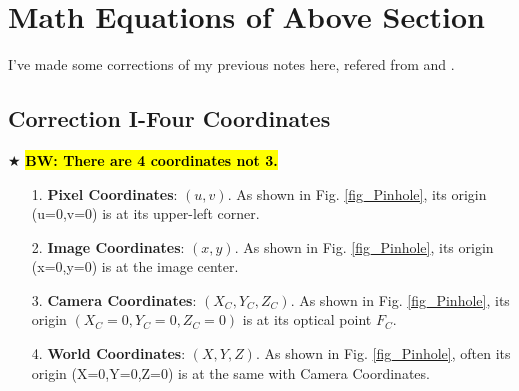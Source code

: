 \documentclass{article}
\begin{document}
\section{Math Equations of Above Section}
\label{sec:Math_Equ_conclusion}
I've made some corrections of my previous notes here, refered from \cite{ref_Four_Coordinates} and \cite{ref_OpenCV_camera_calibration}.

\subsection{Correction I-Four Coordinates}
\label{ssec:math_Correction_I}
$\bigstar$ \hl{\textbf{BW: There are 4 coordinates not 3.}}
\begin{itemize}
	\item [1.] \textbf{Pixel Coordinates}: $(u,v)$. As shown in Fig. \ref{fig_Pinhole}, its origin (u=0,v=0) is at its upper-left corner.
	\item [2.] \textbf{Image Coordinates}: $(x,y)$. As shown in Fig. \ref{fig_Pinhole}, its origin (x=0,y=0) is at the image center.
	\item [3.] \textbf{Camera Coordinates}: $(X_C,Y_C,Z_C)$. As shown in Fig. \ref{fig_Pinhole}, its origin $(X_C=0,Y_C=0,Z_C=0)$ is at its optical point $F_C$.
	\item [4.] \textbf{World Coordinates}: $(X,Y,Z)$. As shown in Fig. \ref{fig_Pinhole}, often its origin (X=0,Y=0,Z=0) is at the same with Camera Coordinates.
\end{itemize}
\end{document}
